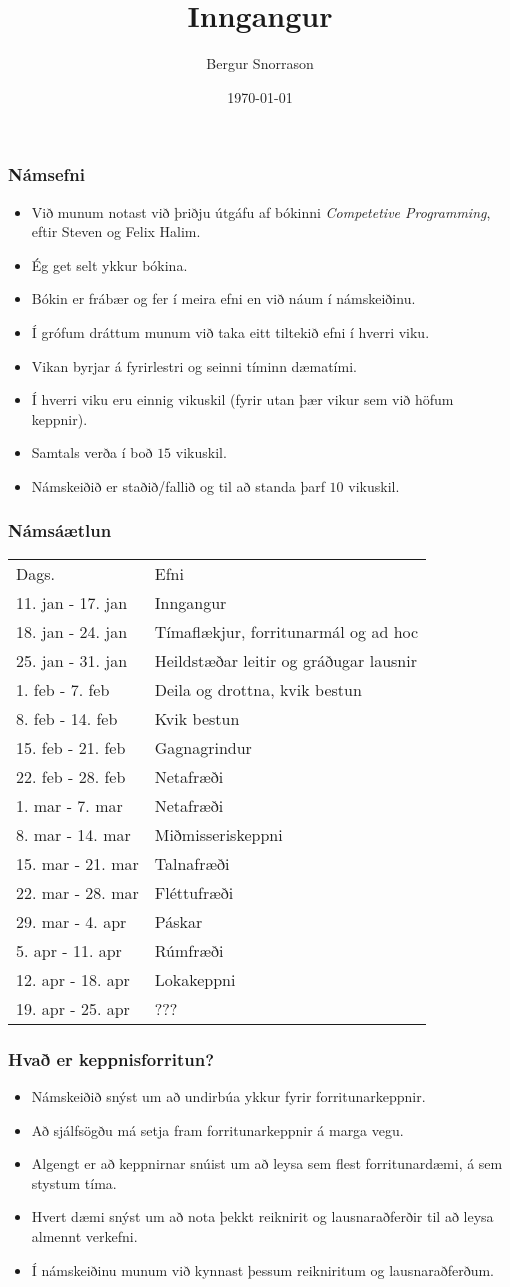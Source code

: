 \documentclass[handout]{beamer}
\title{Inngangur}
\author{Bergur Snorrason}
\date{\today}
\newcommand\env[2]
{
	\begin{#1}
	#2
	\end{#1}
}
\begin{document}
\frame{\titlepage}

\env{frame}
{
	\frametitle{Námsefni}
	\env{itemize}
	{
		\item<1-> Við munum notast við þriðju útgáfu af bókinni \emph{Competetive Programming}, eftir Steven og Felix Halim.
		\item<2-> Ég get selt ykkur bókina.
		\item<3-> Bókin er frábær og fer í meira efni en við náum í námskeiðinu.
		\item<4-> Í grófum dráttum munum við taka eitt tiltekið efni í hverri viku.
		\item<5-> Vikan byrjar á fyrirlestri og seinni tíminn dæmatími.
		\item<6-> Í hverri viku eru einnig vikuskil (fyrir utan þær vikur sem við höfum keppnir).
		\item<7-> Samtals verða í boð $15$ vikuskil.
		\item<8-> Námskeiðið er staðið/fallið og til að standa þarf $10$ vikuskil.
	}
}

\env{frame}
{
	\frametitle{Námsáætlun}
	\begin{tabular}{l l}
		Dags. & Efni\\
		11. jan - 17. jan & Inngangur\\
		18. jan - 24. jan & Tímaflækjur, forritunarmál og ad hoc\\
		25. jan - 31. jan & Heildstæðar leitir og gráðugar lausnir\\
		1. feb - 7. feb & Deila og drottna, kvik bestun\\
		8. feb - 14. feb & Kvik bestun\\
		15. feb - 21. feb & Gagnagrindur\\
		22. feb - 28. feb & Netafræði\\
		1. mar - 7. mar & Netafræði\\
		8. mar - 14. mar & Miðmisseriskeppni\\
		15. mar - 21. mar & Talnafræði\\
		22. mar - 28. mar & Fléttufræði\\
		29. mar - 4. apr & Páskar\\
		5. apr - 11. apr & Rúmfræði\\
		12. apr - 18. apr & Lokakeppni\\
		19. apr - 25. apr & ???
	\end{tabular}
}

\env{frame}
{
	\frametitle{Hvað er keppnisforritun?}
	\env{itemize}
	{
		\item<1-> Námskeiðið snýst um að undirbúa ykkur fyrir forritunarkeppnir.
		\item<2-> Að sjálfsögðu má setja fram forritunarkeppnir á marga vegu.
		\item<3-> Algengt er að keppnirnar snúist um að leysa sem flest forritunardæmi, á sem stystum tíma.
		\item<4-> Hvert dæmi snýst um að nota þekkt reiknirit og lausnaraðferðir til að leysa almennt verkefni.
		\item<5-> Í námskeiðinu munum við kynnast þessum reikniritum og lausnaraðferðum.
	}
}
\end{document}
